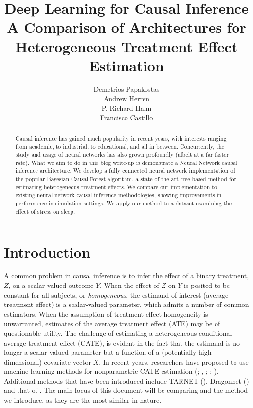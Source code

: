 \documentclass[11pt,  dvipsnames, table, x11name]{article}
\begin{document}
	\title{\textbf{Deep Learning for Causal Inference}\\ 
		\Large{A Comparison of Architectures for Heterogeneous Treatment Effect Estimation}}
	\author{Demetrios Papakostas\\ Andrew Herren \\P. Richard Hahn\\ Francisco Castillo}
	\date{}
	
	\maketitle
	\begin{abstract}
		Causal inference has gained much popularity in recent years, with interests ranging from academic, to industrial, to educational, and all in between.  Concurrently, the study and usage of neural networks has also grown profoundly (albeit at a far faster rate).  What we aim to do in this blog write-up is demonstrate a Neural Network causal inference architecture.  We develop a fully connected neural network implementation of the popular Bayesian Causal Forest algorithm, a state of the art tree based method for estimating heterogeneous treatment effects. We compare our implementation to existing neural network causal inference methodologies, showing improvements in performance in simulation settings.  We apply our method to a dataset examining the effect of stress on sleep.
	\end{abstract}
	
	\section{Introduction}
	A common problem in causal inference is to infer the effect of a binary treatment, 
	$Z$, on a scalar-valued outcome $Y$. When the effect of $Z$ on $Y$ is posited to be constant 
	for all subjects, or \textit{homogeneous}, the estimand of interest (average treatment effect) is a scalar-valued 
	parameter, which admits a number of common estimators. When the assumption of treatment effect homogeneity is 
	unwarranted, estimates of the average treatment effect (ATE) may be of questionable utility. The challenge of 
	estimating a heterogeneous conditional average treatment effect (CATE), is evident in the fact that the estimand is no longer 
	a scalar-valued parameter but a function of a (potentially high dimensional) covariate vector $X$. In recent years, 
	researchers have proposed to use machine learning methods for nonparametric CATE estimation (\cite{hahn2020bayesian}; \cite{krantsevich2021stochastic},
	\cite{hill2011bayesian}; \cite{wager2018estimation}; \cite{farrell2020deep}).  Additional methods that have been introduced include TARNET (\cite{shalit}), Dragonnet (\cite{shi2019adapting}) and that of \cite{chen2018heterogeneous}.  The main focus of this document will be comparing \cite{farrell2020deep} and the method we introduce, as they are the most similar in nature.  
	
\end{document}
